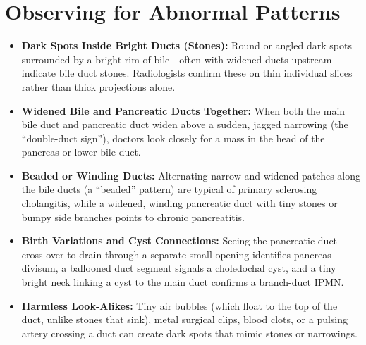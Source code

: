 \section{Observing for Abnormal Patterns}
\begin{itemize}
\item \textbf{Dark Spots Inside Bright Ducts (Stones):} Round or angled dark spots surrounded by a bright rim of bile---often with widened ducts upstream---indicate bile duct stones. Radiologists confirm these on thin individual slices rather than thick projections alone.
\item \textbf{Widened Bile and Pancreatic Ducts Together:} When both the main bile duct and pancreatic duct widen above a sudden, jagged narrowing (the ``double-duct sign''), doctors look closely for a mass in the head of the pancreas or lower bile duct.
\item \textbf{Beaded or Winding Ducts:} Alternating narrow and widened patches along the bile ducts (a ``beaded'' pattern) are typical of primary sclerosing cholangitis, while a widened, winding pancreatic duct with tiny stones or bumpy side branches points to chronic pancreatitis.
\item \textbf{Birth Variations and Cyst Connections:} Seeing the pancreatic duct cross over to drain through a separate small opening identifies pancreas divisum, a ballooned duct segment signals a choledochal cyst, and a tiny bright neck linking a cyst to the main duct confirms a branch-duct IPMN.
\item \textbf{Harmless Look-Alikes:} Tiny air bubbles (which float to the top of the duct, unlike stones that sink), metal surgical clips, blood clots, or a pulsing artery crossing a duct can create dark spots that mimic stones or narrowings.
\end{itemize}

